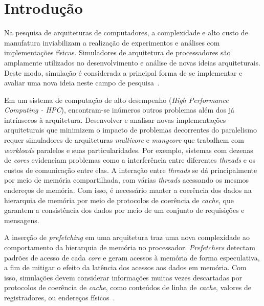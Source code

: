 \documentclass[12pt]{article}
\begin{document}
\vspace{-1mm}
\section{Introdução}

\vspace{-1mm}
Na pesquisa de arquiteturas de computadores, a complexidade e alto custo de manufatura inviabilizam a realização de experimentos e análises com implementações físicas. 
Simuladores de arquitetura de processadores são amplamente utilizados no desenvolvimento e análise de novas ideias arquiteturais.
Deste modo, simulação é considerada a principal forma de se implementar e avaliar uma nova ideia neste campo de pesquisa~\mbox{\cite{demme2014overcoming}}.

\vspace{-2mm}
Em um sistema de computação de alto desempenho (\textit{High Performance Computing - HPC}), encontram-se inúmeros outros problemas além dos já intrínsecos à arquitetura. 
Desenvolver e analisar novas implementações arquiteturais que minimizem o impacto de problemas decorrentes do paralelismo requer simuladores de arquiteturas \textit{multicore} e \textit{manycore} que trabalhem com \textit{workloads} paralelos e suas particularidades.
Por exemplo, sistemas com dezenas de \textit{cores} evidenciam problemas como a interferência entre diferentes \textit{threads} e os custos de comunicação entre elas. 
A interação entre \textit{threads} se dá principalmente por meio de memória compartilhada, com várias \textit{threads} acessando os mesmos endereços de memória.
Com isso, é necessário manter a coerência dos dados na hierarquia de memória por meio de protocolos de coerência de \textit{cache}, que garantem a consistência dos dados por meio de um conjunto de requisições e mensagens.

\vspace{-2mm}
A inserção de \textit{prefetching} em uma arquitetura traz uma nova complexidade ao comportamento da hierarquia de memória no processador.
\textit{Prefetchers} detectam padrões de acesso de cada \textit{core} e geram acessos à memória de forma especulativa, a fim de mitigar o efeito da latência dos acessos aos dados em memória.
Com isso, simulações devem considerar informações muitas vezes descartadas por protocolos de coerência de \textit{cache}, como conteúdos de linha de \textit{cache}\cite{huberty2018content}, valores de registradores\cite{nesbit2004data}, ou endereços físicos~\cite{bakhshalipour2019evaluation}.
 
\end{document}
